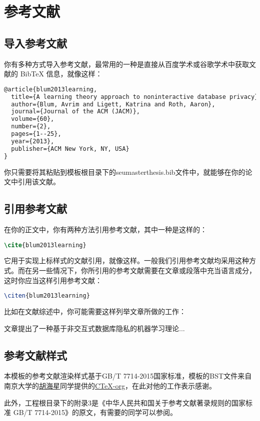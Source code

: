 \chapter{参考文献}
\label{chp:bib}

\section{导入参考文献}

你有多种方式导入参考文献，最常用的一种是直接从百度学术或谷歌学术中获取文献的 BibTeX 信息，就像这样：

\begin{tcolorbox}
\begin{lstlisting}[language=TeX]
@article{blum2013learning,
  title={A learning theory approach to noninteractive database privacy},
  author={Blum, Avrim and Ligett, Katrina and Roth, Aaron},
  journal={Journal of the ACM (JACM)},
  volume={60},
  number={2},
  pages={1--25},
  year={2013},
  publisher={ACM New York, NY, USA}
}
\end{lstlisting}
\end{tcolorbox}

你只需要将其粘贴到模板根目录下的seumasterthesis.bib文件中，就能够在你的论文中引用该文献。

\section{引用参考文献}

在你的正文中，你有两种方法引用参考文献，其中一种是这样的：

\begin{tcolorbox}
\begin{lstlisting}[language=TeX]
\cite{blum2013learning}
\end{lstlisting}
\end{tcolorbox}

\noindent 它用于实现上标样式的文献引用，就像这样\cite{blum2013learning}。一般我们引用参考文献均采用这种方式。而在另一些情况下，你所引用的参考文献需要在文章或段落中充当语言成分，这时你应当这样引用参考文献：

\begin{tcolorbox}
\begin{lstlisting}[language=TeX]
\citen{blum2013learning}
\end{lstlisting}
\end{tcolorbox}

\noindent 比如在文献综述中，你可能需要这样列举文章所做的工作：

文章提出了一种基于非交互式数据库隐私的机器学习理论...

\section{参考文献样式}

本模板的参考文献渲染样式基于GB/T 7714-2015国家标准，模板的BST文件来自南京大学的\href{https://github.com/Haixing-Hu}{胡海星}同学提供的\href{https://github.com/CTeX-org/gbt7714-bibtex-style}{CTeX-org}，在此对他的工作表示感谢。

此外，工程根目录下的附录3是《中华人民共和国关于参考文献著录规则的国家标准 GB/T 7714-2015》的原文，有需要的同学可以参阅。